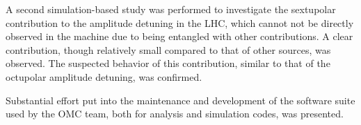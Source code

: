 A second simulation-based study was performed to investigate the sextupolar contribution to the amplitude detuning in the LHC, which cannot not be directly observed in the machine due to being entangled with other contributions.
A clear contribution, though relatively small compared to that of other sources, was observed.
The suspected behavior of this contribution, similar to that of the octupolar amplitude detuning, was confirmed.

Substantial effort put into the maintenance and development of the software suite used by the OMC team, both for analysis and simulation codes, was presented.

